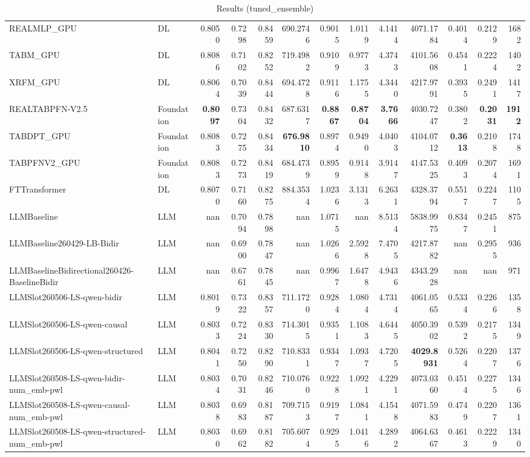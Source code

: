 \begin{table}[htbp]
{\begin{tabular}{ll|rrrrrrrrrr|r}
REALMLP\_GPU & DL & 0.8050 & 0.7298 & 0.8459 & 690.2746 & 0.9015 & 1.0119 & 4.1414 & 4071.1784 & 0.4014 & 0.2129 & 1682 \\
TABM\_GPU & DL & 0.8086 & 0.7102 & 0.8252 & 719.4982 & 0.9109 & 0.9773 & 4.3743 & 4101.5608 & 0.4541 & 0.2224 & 1402 \\
XRFM\_GPU & DL & 0.8064 & 0.7039 & 0.8444 & 694.4728 & 0.9116 & 1.1755 & 4.3440 & 4217.9791 & 0.3935 & 0.2491 & 1417 \\
REALTABPFN-V2.5 & Foundation & \textbf{0.8097} & 0.7304 & 0.8432 & 687.6317 & \textbf{0.8867} & \textbf{0.8704} & \textbf{3.7666} & 4030.7247 & 0.3802 & \textbf{0.2031} & \textbf{1912} \\
TABDPT\_GPU & Foundation & 0.8083 & 0.7275 & 0.8434 & \textbf{676.9810} & 0.8974 & 0.9490 & 4.0403 & 4104.0712 & \textbf{0.3613} & 0.2108 & 1748 \\
TABPFNV2\_GPU & Foundation & 0.8083 & 0.7273 & 0.8419 & 684.4739 & 0.8959 & 0.9148 & 3.9147 & 4147.5325 & 0.4093 & 0.2074 & 1691 \\
\midrule
FTTransformer & DL & 0.8070 & 0.7160 & 0.8275 & 884.3534 & 1.0236 & 3.1313 & 6.2631 & 4328.3794 & 0.5517 & 0.2247 & 1105 \\
LLMBaseline & LLM & nan & 0.7094 & 0.7898 & nan & 1.0715 & nan & 8.5134 & 5838.9975 & 0.8347 & 0.2451 & 875 \\
LLMBaseline260429-LB-Bidir & LLM & nan & 0.6900 & 0.7847 & nan & 1.0266 & 2.5928 & 7.4705 & 4217.8782 & nan & 0.2955 & 936 \\
LLMBaselineBidirectional260426-BaselineBidir & LLM & nan & 0.6761 & 0.7845 & nan & 0.9967 & 1.6478 & 4.9436 & 4343.2928 & nan & nan & 971 \\
LLMSlot260506-LS-qwen-bidir & LLM & 0.8019 & 0.7322 & 0.8357 & 711.1720 & 0.9284 & 1.0804 & 4.7314 & 4061.0565 & 0.5334 & 0.2266 & 1358 \\
LLMSlot260506-LS-qwen-causal & LLM & 0.8033 & 0.7224 & 0.8330 & 714.3015 & 0.9351 & 1.1083 & 4.6445 & 4050.3902 & 0.5392 & 0.2175 & 1349 \\
LLMSlot260506-LS-qwen-structured & LLM & 0.8041 & 0.7250 & 0.8290 & 710.8331 & 0.9347 & 1.0937 & 4.7205 & \textbf{4029.8931} & 0.5264 & 0.2207 & 1376 \\
LLMSlot260508-LS-qwen-bidir-num\_emb-pwl & LLM & 0.8034 & 0.7031 & 0.8246 & 710.0760 & 0.9228 & 1.0921 & 4.2291 & 4073.0360 & 0.4514 & 0.2275 & 1346 \\
LLMSlot260508-LS-qwen-causal-num\_emb-pwl & LLM & 0.8038 & 0.6983 & 0.8187 & 709.7153 & 0.9197 & 1.0841 & 4.1548 & 4071.5983 & 0.4749 & 0.2207 & 1361 \\
LLMSlot260508-LS-qwen-structured-num\_emb-pwl & LLM & 0.8030 & 0.6962 & 0.8182 & 705.6074 & 0.9295 & 1.0416 & 4.2892 & 4064.6367 & 0.4613 & 0.2229 & 1340 \\
\bottomrule
\end{tabular}
}
\caption{Results (tuned_ensemble)}
\label{tab:results_tuned_ensemble}
\end{table}
